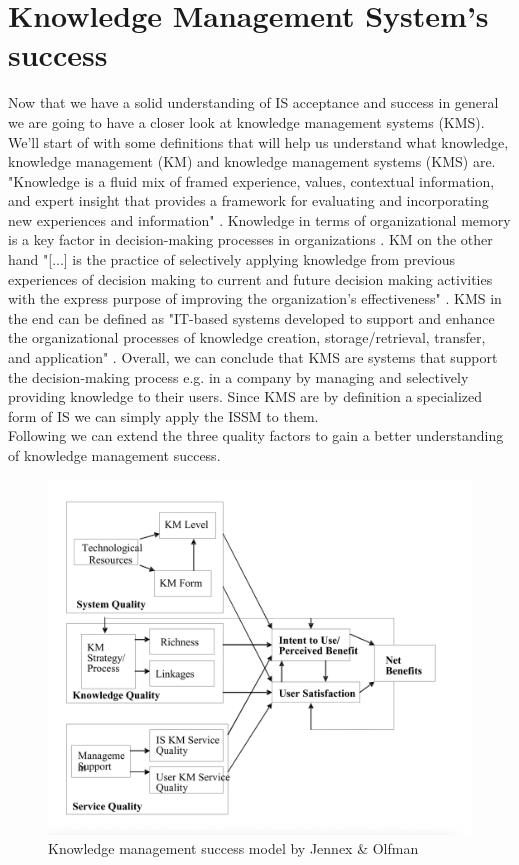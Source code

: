 \documentclass[
	english,
	ruledheaders=section,%
	class=report,%
	thesis={type=bachelor},%
	accentcolor=1b,%
	custommargins=true,%
	marginpar=false,%
	parskip=half-,%
	fontsize=11pt,%
	DIV=14,
]{tudapub}
\begin{document}
\section{Knowledge Management System's success}
Now that we have a solid understanding of IS acceptance and success in general we are going to have a closer look at knowledge management systems (KMS). We'll start of with some definitions that will help us understand what knowledge, knowledge management (KM) and knowledge management systems (KMS) are. "Knowledge is a fluid mix of framed experience, values, contextual information, and expert insight that provides a framework for
evaluating and incorporating new experiences and information" \parencite[p.~4]{Davenport1998}. Knowledge in terms of organizational memory is a key factor in decision-making processes in organizations \parencite[p.~52]{Jennex2006}. KM on the other hand "[...] is the practice of selectively applying knowledge from previous experiences of decision making to current and future decision making activities with the express purpose of improving the organization’s effectiveness" \parencite[p.~53]{Jennex2006WhatIsKM}. KMS in the end can be defined as "IT-based systems developed to support and
enhance the organizational processes of knowledge creation, storage/retrieval, transfer, and application" \parencite[p.~114]{Alavi2001}. Overall, we can conclude that KMS are systems that support the decision-making process e.g. in a company by managing and selectively providing knowledge to their users. Since KMS are by definition a specialized form of IS we can simply apply the ISSM to them.\\
Following \cite{Jennex2006} we can extend the three quality factors to gain a better understanding
of knowledge management success.\\
\begin{figure}
    \centering
    \includegraphics[width=1\linewidth]{knowledge_management_success.png}
    \caption{Knowledge management success model by Jennex & Olfman \parencite[p.~56]{Jennex2006}}
    \label{fig:enter-label}
\end{figure}
\end{document}

